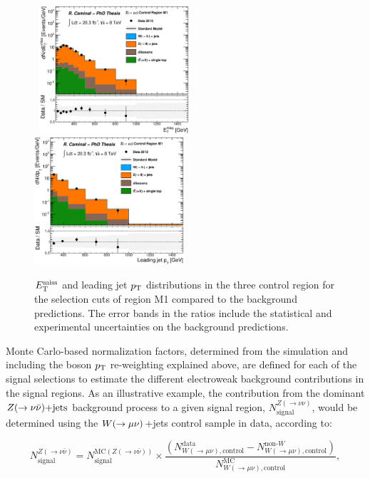 \begin{figure}[!ht]
\begin{center}
{    }
    \mbox{
      \includegraphics[width=0.495\textwidth]{MonojetAnalysis/Figures/plot_Stop_A6_CRzmm_met.eps}
      \includegraphics[width=0.495\textwidth]{MonojetAnalysis/Figures/plot_Stop_A6_CRzmm_pt1.eps}
    }
  \end{center}
  \caption[$\met$ and leading jet $\pt$ distributions in the three control region for the selection cuts of region M1 compared to the background predictions.]{$\met$ and leading jet $\pt$ distributions in the three control region for the selection cuts of region M1 compared to the background predictions. The error bands in the ratios include the statistical and experimental uncertainties on the background predictions.}
  \label{fig:Plot_M1_CR_beforeFit}
\end{figure}

Monte Carlo-based normalization factors, determined from the \sherpa{} simulation and including the boson $\pt$ re-weighting explained above, are defined for each of the signal selections to estimate the different electroweak background contributions in the signal regions.
As an illustrative example, the contribution from the dominant $Z(\rightarrow \nu \bar{\nu})\text{+jets}$ background process to a given signal region, $N^{Z(\rightarrow\nu\nu)}_{\text{signal}}$, would be determined using the $W(\rightarrow \mu \nu)$+jets control sample in data, according to:

\begin{equation}
N^{Z(\rightarrow\nu\bar{\nu})}_{\text{signal}} = N^{\text{MC}(Z(\rightarrow\nu\bar{\nu}))}_{\text{signal}} \times
        \frac{\left(N^{\text{data}}_{W(\rightarrow\mu\nu),\text{control}} - N^{\text{non-}W}_{W(\rightarrow\mu\nu),\text{control}} \right)}{N^{\text{MC}}_{W(\rightarrow\mu\nu),\text{control}}},
\label{eq:scaleFactorZnunu}
\end{equation}

